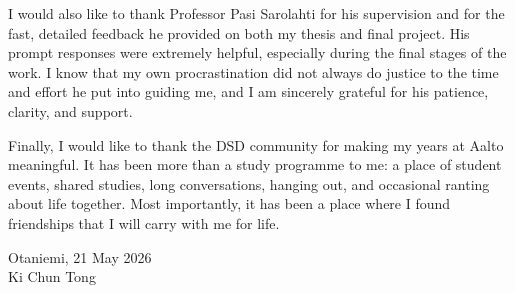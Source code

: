 \documentclass[english,12pt,a4paper,elec,utf8,a-2b,online]{aaltothesis}
\begin{document}
I would also like to thank Professor Pasi Sarolahti for his supervision and for the fast, detailed feedback he provided on both my thesis and final project. His prompt responses were extremely helpful, especially during the final stages of the work. I know that my own procrastination did not always do justice to the time and effort he put into guiding me, and I am sincerely grateful for his patience, clarity, and support.

Finally, I would like to thank the DSD community for making my years at Aalto meaningful. It has been more than a study programme to me: a place of student events, shared studies, long conversations, hanging out, and occasional ranting about life together. Most importantly, it has been a place where I found friendships that I will carry with me for life.

\vspace{2cm}
Otaniemi, 21 May 2026\\

\vspace{5mm}
{\hfill Ki Chun Tong \hspace{1cm}}

\clearpage

\clearpage
\begingroup
\let\oldaddcontentsline\addcontentsline
\renewcommand{\addcontentsline}[3]{}
\begin{abstractpage}[english]

\end{abstractpage}
\endgroup

\clearpage
\tableofcontents


\dothesispagenumbering{}




\clearpage
\printbibliography[title={References}, heading=bibintoc]
\end{document}
